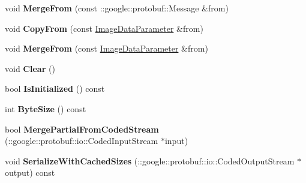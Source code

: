 \begin{DoxyCompactItemize}
\item 
\mbox{\label{classcaffe_1_1_image_data_parameter_aeacf1f8710289fdb608d766ea3a53d02}} 
void {\bfseries Merge\+From} (const \+::google\+::protobuf\+::\+Message \&from)
\item 
\mbox{\label{classcaffe_1_1_image_data_parameter_a4d93d9bad54206ad4db90a6d6043015a}} 
void {\bfseries Copy\+From} (const \mbox{\hyperlink{classcaffe_1_1_image_data_parameter}{Image\+Data\+Parameter}} \&from)
\item 
\mbox{\label{classcaffe_1_1_image_data_parameter_ad3a44eb972536ec4455cd8c6fea14316}} 
void {\bfseries Merge\+From} (const \mbox{\hyperlink{classcaffe_1_1_image_data_parameter}{Image\+Data\+Parameter}} \&from)
\item 
\mbox{\label{classcaffe_1_1_image_data_parameter_a14132c786b77391664a2a65be6a8ea94}} 
void {\bfseries Clear} ()
\item 
\mbox{\label{classcaffe_1_1_image_data_parameter_a76b3891e2c8e6c2f0665d5bc7b70a87b}} 
bool {\bfseries Is\+Initialized} () const
\item 
\mbox{\label{classcaffe_1_1_image_data_parameter_a361edd992993587155eac0671bbb93f9}} 
int {\bfseries Byte\+Size} () const
\item 
\mbox{\label{classcaffe_1_1_image_data_parameter_a38b690d55f118caa6a92ee13f79a17b9}} 
bool {\bfseries Merge\+Partial\+From\+Coded\+Stream} (\+::google\+::protobuf\+::io\+::\+Coded\+Input\+Stream $\ast$input)
\item 
\mbox{\label{classcaffe_1_1_image_data_parameter_a85bc8110697d61879bee083d131fe415}} 
void {\bfseries Serialize\+With\+Cached\+Sizes} (\+::google\+::protobuf\+::io\+::\+Coded\+Output\+Stream $\ast$output) const
\item 
\mbox{\label{classcaffe_1_1_image_data_parameter_a76ef499eff5516786f513c64b50f8b2c}} 

\end{DoxyCompactItemize}

